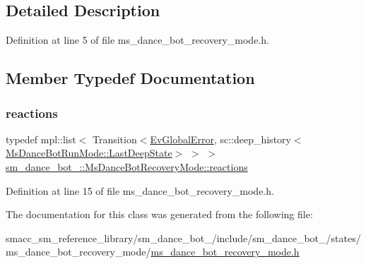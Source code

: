 \subsection{Detailed Description}


Definition at line 5 of file ms\+\_\+dance\+\_\+bot\+\_\+recovery\+\_\+mode.\+h.



\subsection{Member Typedef Documentation}
\mbox{\label{classsm__dance__bot__2_1_1MsDanceBotRecoveryMode_a84f4a67688a4c5e1469bd1ced648cf53}} 
\subsubsection{\texorpdfstring{reactions}{reactions}}
{\footnotesize\ttfamily typedef mpl\+::list$<$ Transition$<$\hyperlink{structsm__dance__bot__2_1_1EvGlobalError}{Ev\+Global\+Error}, sc\+::deep\+\_\+history$<$\hyperlink{classsmacc_1_1SmaccState_a60088405d2d99d468caa0baa3b2830a8}{Ms\+Dance\+Bot\+Run\+Mode\+::\+Last\+Deep\+State}$>$ $>$ $>$ \hyperlink{classsm__dance__bot__2_1_1MsDanceBotRecoveryMode_a84f4a67688a4c5e1469bd1ced648cf53}{sm\+\_\+dance\+\_\+bot\+\_\+::\+Ms\+Dance\+Bot\+Recovery\+Mode\+::reactions}}



Definition at line 15 of file ms\+\_\+dance\+\_\+bot\+\_\+recovery\+\_\+mode.\+h.



The documentation for this class was generated from the following file\+:\begin{DoxyCompactItemize}
\item 
smacc\+\_\+sm\+\_\+reference\+\_\+library/sm\+\_\+dance\+\_\+bot\+\_/include/sm\+\_\+dance\+\_\+bot\+\_/states/ms\+\_\+dance\+\_\+bot\+\_\+recovery\+\_\+mode/\hyperlink{sm__dance__bot__2_2include_2sm__dance__bot__2_2states_2ms__dance__bot__recovery__mode_2ms__dance__bot__recovery__mode_8h}{ms\+\_\+dance\+\_\+bot\+\_\+recovery\+\_\+mode.\+h}\end{DoxyCompactItemize}
